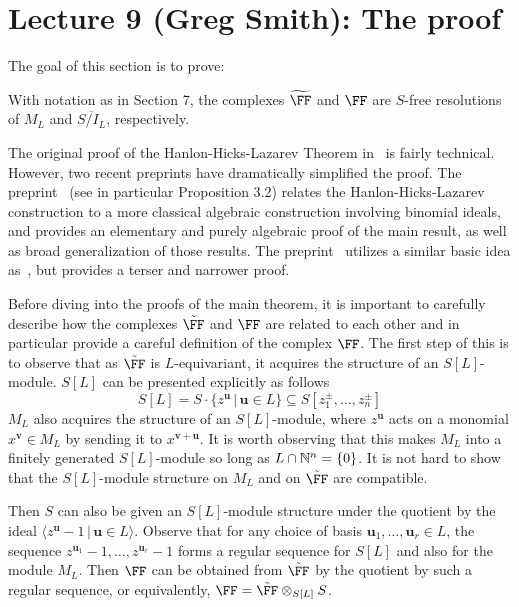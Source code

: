 \documentclass{amsart}
\begin{document}
\section{Lecture 9 (Greg Smith): The proof}\label{lec:9-HHL-proof}
The goal of this section is to prove:

\begin{theorem} \cite{HHL24}\label{thm:HHL-resolution}
With notation as in Section 7, the complexes $\tF$ and $\FF$ are $S$-free resolutions of $M_{L}$ and $\overline{S/I_{L}}$, respectively. 
\end{theorem}

The original proof of the Hanlon-Hicks-Lazarev Theorem in~\cite{HHL24} is fairly technical.  However, two recent preprints have dramatically simplified the proof.  The preprint~\cite{BCS+25} (see in particular Proposition 3.2) relates the Hanlon-Hicks-Lazarev construction to a more classical algebraic construction involving binomial ideals, and provides an elementary and purely algebraic proof of the main result, as well as broad generalization of those results.  The preprint~\cite{BH25} utilizes a similar basic idea as~\cite{BCS+25}, but provides a terser and narrower proof.

Before diving into the proofs of the main theorem, it is important to carefully describe how the complexes $\tilde \FF$ and $\FF$ are related to each other and in particular provide a careful definition of the complex $\FF$.
The first step of this is to observe that as $\tilde \FF$ is $L$-equivariant, it acquires the structure of an $S[L]$-module. $S[L]$ can be presented explicitly as follows
\[S[L]=S\cdot \{z^{\mathbf{u}} \,|\, \mathbf{u}\in L\}\subseteq S[z_1^{\pm},\ldots,z_n^{\pm}]\]
$M_L$ also acquires the structure of an $S[L]$-module, where $z^{\mathbf{u}}$ acts on a monomial $x^{\mathbf{v}}\in M_L$ by sending it to $x^{\mathbf{v}+\mathbf{u}}$. It is worth observing that this makes $M_L$ into a finitely generated $S[L]$-module so long as $L\cap \mathbb N^n=\{0\}$. It is not hard to show that the $S[L]$-module structure on $M_L$ and on $\tilde \FF$ are compatible.

Then $S$ can also be given an $S[L]$-module structure under the quotient by the ideal $\langle z^{\mathbf{u}}-1 \,|\, \mathbf{u}\in L\rangle$. Observe that for any choice of basis $\mathbf{u}_1,\ldots,\mathbf{u}_r\in L$, the sequence $z^{\mathbf{u}_1}-1,\ldots,z^{\mathbf{u}_r}-1$ forms a regular sequence for $S[L]$ and also for the module $M_L$. Then $\FF$ can be obtained from $\tilde \FF$ by the quotient by such a regular sequence, or equivalently, $\FF = \tilde \FF \otimes_{S[L]} S$.
\end{document}

